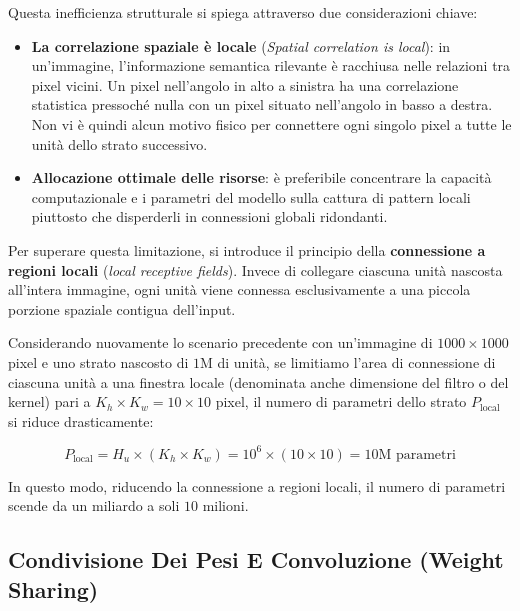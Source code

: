 ﻿\documentclass[11pt, a4paper]{article}
\begin{document}
Questa inefficienza strutturale si spiega attraverso due considerazioni chiave:
\begin{itemize}
    \item \textbf{La correlazione spaziale è locale} (\emph{Spatial correlation is local}): in un'immagine, l'informazione semantica rilevante è racchiusa nelle relazioni tra pixel vicini. Un pixel nell'angolo in alto a sinistra ha una correlazione statistica pressoché nulla con un pixel situato nell'angolo in basso a destra. Non vi è quindi alcun motivo fisico per connettere ogni singolo pixel a tutte le unità dello strato successivo.
    \item \textbf{Allocazione ottimale delle risorse}: è preferibile concentrare la capacità computazionale e i parametri del modello sulla cattura di pattern locali piuttosto che disperderli in connessioni globali ridondanti.
\end{itemize}

Per superare questa limitazione, si introduce il principio della \textbf{connessione a regioni locali} (\emph{local receptive fields}). Invece di collegare ciascuna unità nascosta all'intera immagine, ogni unità viene connessa esclusivamente a una piccola porzione spaziale contigua dell'input.

Considerando nuovamente lo scenario precedente con un'immagine di $1000 \times 1000$ pixel e uno strato nascosto di $1\text{M}$ di unità, se limitiamo l'area di connessione di ciascuna unità a una finestra locale (denominata anche dimensione del filtro o del kernel) pari a $K_h \times K_w = 10 \times 10$ pixel, il numero di parametri dello strato $P_{\text{local}}$ si riduce drasticamente:

\[
P_{\text{local}} = H_u \times (K_h \times K_w) = 10^6 \times (10 \times 10) = 10\text{M} \text{ parametri}
\]


In questo modo, riducendo la connessione a regioni locali, il numero di parametri scende da un miliardo a soli $10$ milioni.

\newpage

\subsection{Condivisione Dei Pesi E Convoluzione (Weight Sharing)}
\end{document}
